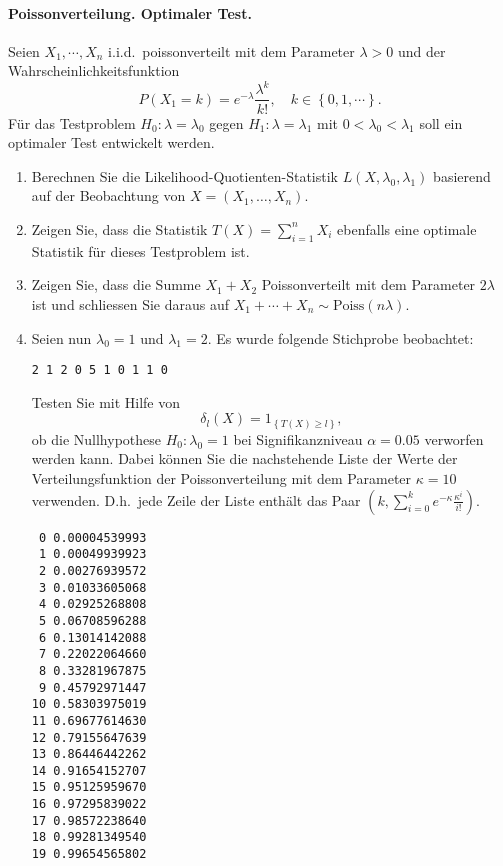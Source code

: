 \paragraph{Poissonverteilung. Optimaler Test.} Seien $X_1, \cdots, X_n$ i.i.d.\
poissonverteilt mit dem Parameter $\lambda>0$ und der Wahrscheinlichkeitsfunktion
\begin{equation*}
    P(X_1 = k) = e^{-\lambda} \frac{ \lambda^k}{k!}, \quad k \in \left\{ 0, 1, \cdots \right\}.
\end{equation*}
Für das Testproblem $H_0 : \lambda=\lambda_0$ gegen $H_1 : \lambda=\lambda_1$
mit $0<\lambda_0<\lambda_1$ soll ein optimaler Test entwickelt werden.
\begin{enumerate}
    \item Berechnen Sie die Likelihood-Quotienten-Statistik
        $L(X,\lambda_0,\lambda_1)$ basierend auf der Beobachtung von $X=\left(
        X_1,\ldots,X_n \right)$.
    \item Zeigen Sie, dass die Statistik $T(X)= \sum_{i=1}^{n} X_i$ ebenfalls
        eine optimale Statistik für dieses Testproblem ist.
    \item Zeigen Sie, dass die Summe $X_1+X_2$ Poissonverteilt mit dem
        Parameter $2 \lambda$ ist und schliessen Sie daraus auf $X_1 + \cdots +
        X_n \sim \text{Poiss}(n \lambda)$. 
    \item Seien nun $\lambda_0=1$ und $\lambda_1=2$. Es wurde folgende Stichprobe beobachtet:
        \begin{lstlisting}
2 1 2 0 5 1 0 1 1 0
        \end{lstlisting}
        Testen Sie mit Hilfe von 
        \begin{equation*}
            \delta_l(X) = 1_{   \left\{ T(X) \geq l \right\}},
        \end{equation*}
        ob die Nullhypothese $H_0 : \lambda_0=1$ bei Signifikanzniveau
        $\alpha=0.05$ verworfen werden kann. Dabei können Sie die nachstehende
        Liste der Werte der Verteilungsfunktion der Poissonverteilung mit dem
        Parameter $\kappa=10$ verwenden.  D.h.\ jede Zeile der Liste
        enthält das Paar  $\left( k, \sum_{i=0}^{k} e^{-\kappa}
        \frac{\kappa^{i}}{i!}\right)$.
\begin{lstlisting}
 0 0.00004539993
 1 0.00049939923
 2 0.00276939572
 3 0.01033605068
 4 0.02925268808
 5 0.06708596288
 6 0.13014142088
 7 0.22022064660
 8 0.33281967875
 9 0.45792971447
10 0.58303975019
11 0.69677614630
12 0.79155647639
13 0.86446442262
14 0.91654152707
15 0.95125959670
16 0.97295839022
17 0.98572238640
18 0.99281349540
19 0.99654565802
\end{lstlisting}
\end{enumerate}

